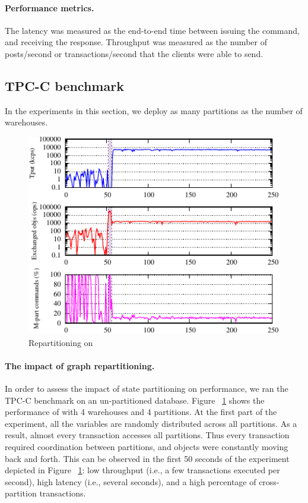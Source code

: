 \paragraph*{Performance metrics.}
%
The latency was measured as the end-to-end time between issuing the
command, and receiving the response.  Throughput was measured as the
number of posts/second or transactions/second that the clients were able to send.

\subsection{TPC-C benchmark}
\label{sec:evaluation:tpc-c}

In the experiments in this section, we deploy as many partitions as the number of warehouses.

\begin{figure}[ht!]
  \centering
    \includegraphics[width=\columnwidth]{figures/eurosys/tpcc-detail-dynastar}
  \caption{Repartitioning on \dynastar}
  \label{fig:tpcc_repartitioning}
\end{figure}

\paragraph{The impact of graph repartitioning.}
In order to assess the impact of state partitioning on performance, we ran the TPC-C benchmark on an un-partitioned database.  Figure ~\ref{fig:tpcc_repartitioning} 
shows the performance of \dynastar with 4 warehouses and 4 partitions.
At the first part of the experiment, all the variables are randomly distributed across all partitions.
As a result, almost every transaction accesses all partitions. Thus every transaction 
required coordination between partitions, and objects were constantly moving back and forth. 
This can be observed in the first 50 seconds of the experiment depicted in Figure ~\ref{fig:tpcc_repartitioning}: low throughput (i.e., a few transactions executed per second), high latency (i.e., several seconds), and a high percentage of cross-partition transactions.

